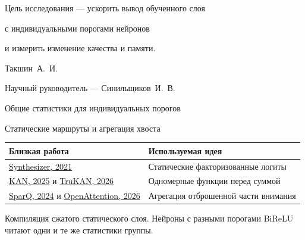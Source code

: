 \documentclass[aspectratio=169,11pt]{beamer}
\begin{document}
\begin{frame}[plain]
\vspace{0.65cm}
{\fontsize{22}{26}\selectfont\bfseries\projecttitle\par}
\vspace{0.62cm}
{\fontsize{12}{16}\selectfont
Цель исследования — ускорить вывод обученного слоя\par
с индивидуальными порогами нейронов\par
и измерить изменение качества и памяти.\par}
\vspace{0.45cm}
{\fontsize{10.8}{14}
\selectfont\color{Muted}
Такшин~А.~И.\par
Научный руководитель — Синильщиков~И.~В.\par}
\end{frame}

\begin{frame}[t]{Общие статистики для индивидуальных порогов}
\oneslidecontent
\end{frame}

\begin{frame}[t]{Статические маршруты и агрегация хвоста}
\slidebody
\renewcommand{\arraystretch}{1.42}
\begin{tabularx}{\textwidth}{@{}>{\raggedright\arraybackslash}p{4.4cm}X@{}}
\toprule
\textbf{Близкая работа} & \textbf{Используемая идея} \\
\midrule
\href{https://proceedings.mlr.press/v139/tay21a.html}{Synthesizer, 2021} & Статические факторизованные логиты \\
\href{https://arxiv.org/abs/2404.19756}{KAN, 2025} и \href{https://arxiv.org/abs/2602.03879}{TruKAN, 2026} & Одномерные функции перед суммой \\
\href{https://proceedings.mlr.press/v235/ribar24a.html}{SparQ, 2024} и \href{https://arxiv.org/abs/2610.30951}{OpenAttention, 2026} & Агрегация отброшенной части внимания \\
\bottomrule
\end{tabularx}
\par\vspace{0.46cm}
\par
Компиляция сжатого статического слоя. Нейроны с разными порогами
BiReLU читают одни и те же статистики группы.
\end{frame}
\end{document}
